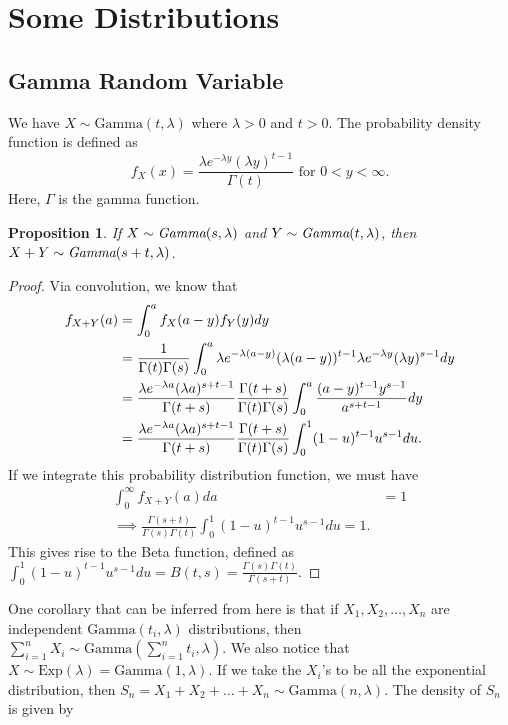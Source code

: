 \documentclass[15pt,a4paper]{book}
\newtheorem{proposition}[theorem]{Proposition}
\theoremstyle{definition}
\begin{document}
\section{Some Distributions}
\subsection{Gamma Random Variable}
We have $X \sim \text{Gamma}(t,\lambda)$ where $\lambda > 0$ and $t > 0$. The probability density function is defined as
\begin{equation}
    f_{X}(x) = \frac{\lambda e^{-\lambda y} (\lambda y)^{t-1}}{\Gamma(t)} \text{ for } 0 < y < \infty.
\end{equation}
Here, $\Gamma$ is the gamma function.
\begin{proposition}
    If $X \sim \emph{Gamma}(s,\lambda)$ and $Y \sim \emph{Gamma}(t,\lambda)$, then $X+Y \sim \emph{Gamma}(s+t,\lambda)$.
\end{proposition}
\begin{proof}
    Via convolution, we know that
    \begin{align}
        f_{X+Y}(a) &= \int_{0}^{a} f_{X}(a-y)f_{Y}(y) dy \notag \\
        &= \frac{1}{\Gamma(t) \Gamma(s)} \int_{0}^{a} \lambda e^{-\lambda(a-y)}(\lambda(a-y))^{t-1} \lambda e^{-\lambda y} (\lambda y)^{s-1} dy \notag \\
        &= \frac{\lambda e^{-\lambda a} (\lambda a)^{s+t-1}}{\Gamma(t+s)} \frac{\Gamma(t+s)}{\Gamma(t) \Gamma(s)} \int_{0}^{a} \frac{(a-y)^{t-1}y^{s-1}}{a^{s+t-1}} dy \notag \\
        &= \frac{\lambda e^{-\lambda a} (\lambda a)^{s+t-1}}{\Gamma(t+s)} \frac{\Gamma(t+s)}{\Gamma(t) \Gamma(s)} \int_{0}^{1} (1-u)^{t-1}u^{s-1} du \notag.
    \end{align}
    If we integrate this probability distribution function, we must have
    \begin{align}
        \int_{0}^{\infty} f_{X+Y}(a)da &= 1 \\
        \implies \frac{\Gamma(s+t)}{\Gamma(s)\Gamma(t)} \int_{0}^{1} (1-u)^{t-1}u^{s-1} du = 1.
    \end{align}
    This gives rise to the Beta function, defined as $\int_{0}^{1} (1-u)^{t-1}u^{s-1}du = B(t,s) = \frac{\Gamma(s)\Gamma(t)}{\Gamma(s+t)}$.
\end{proof}
One corollary that can be inferred from here is that if $X_{1},X_{2},\ldots,X_{n}$ are independent $\text{Gamma}(t_{i},\lambda)$ distributions, then $\sum_{i=1}^{n} X_{i} \sim \text{Gamma}(\sum_{i=1}^{n} t_{i}, \lambda)$. We also notice that $X \sim \text{Exp}(\lambda) = \text{Gamma}(1,\lambda)$. If we take the $X_{i}$'s to be all the exponential distribution, then $S_{n} = X_{1} + X_{2} + \ldots + X_{n} \sim \text{Gamma}(n,\lambda)$. The density of $S_{n}$ is given by
\end{document}
